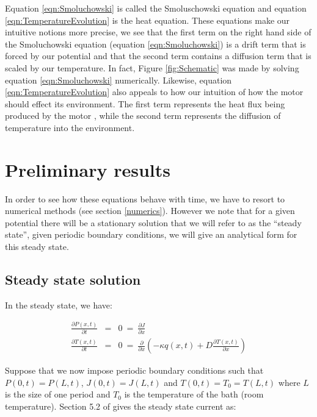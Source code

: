 \documentclass[11pt]{article} %
\begin{document}
Equation \ref{eqn:Smoluchowski} is called the Smoluschowski equation \cite{KellerBustamante2000} and equation \ref{eqn:TemperatureEvolution} is the heat equation. These equations make our intuitive notions more precise, we see that the first term on the right hand side of the Smoluchowski equation (equation \ref{eqn:Smoluchowski}) is a drift term that is forced by our potential and that the second term contains a diffusion term that is scaled by our temperature. In fact, Figure \ref{fig:Schematic} was made by solving equation \ref{eqn:Smoluchowski} numerically. Likewise, equation \ref{eqn:TemperatureEvolution} also appeals to how our intuition of how the motor should effect its environment. The first term represents the heat flux being produced by the motor \cite{M.W.Jack2016}, while the second term represents the diffusion of temperature into the environment.


\section{Preliminary results}
 In order to see how these equations behave with time, we have to resort to numerical methods (see section \ref{numerics}). However we note that for a given potential there will be a stationary solution that we will refer to as the ``steady state'', given periodic boundary conditions, we will give an analytical form for this steady state.

\subsection{Steady state solution}
In the steady state, we have:

\begin{eqnarray}
\frac{\partial P(x, t)}{\partial t} &=&  0 \ = \ \frac{\partial J}{\partial x} \label{eqn:SmoluchowskiSteady} \\
\frac{\partial T(x, t)}{\partial t} &=& 0 \ = \ \frac{\partial}{\partial x} \left ( -\kappa q(x, t) + D \frac{\partial T(x, t)}{\partial x} \right ) \label{eqn:TemperatureSteady}
\end{eqnarray}

Suppose that we now impose periodic boundary conditions such that $P(0, t) = P(L, t)$,  $J(0, t) = J(L, t)$ and $T(0, t) = T_0 = T(L, t)$ where $L$ is the size of one period and $T_0$ is the temperature of the bath (room temperature). Section 5.2 of \cite{Gardiner2009} gives the steady state current as:
\end{document}
